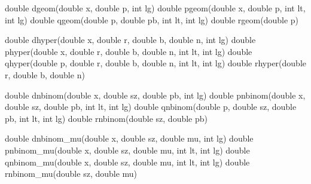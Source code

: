 \documentclass[]{book}
\newenvironment{Shaded}{\begin{snugshade}}{\end{snugshade}}
\newcommand{\DataTypeTok}[1]{\textcolor[rgb]{0.13,0.29,0.53}{#1}}
\newcommand{\NormalTok}[1]{#1}
\begin{document}
\begin{Shaded}
\begin{Highlighting}[]
\DataTypeTok{double}\NormalTok{ dgeom(}\DataTypeTok{double}\NormalTok{ x, }\DataTypeTok{double}\NormalTok{ p, }\DataTypeTok{int}\NormalTok{ lg)        }
\DataTypeTok{double}\NormalTok{ pgeom(}\DataTypeTok{double}\NormalTok{ x, }\DataTypeTok{double}\NormalTok{ p, }\DataTypeTok{int}\NormalTok{ lt, }\DataTypeTok{int}\NormalTok{ lg)    }
\DataTypeTok{double}\NormalTok{ qgeom(}\DataTypeTok{double}\NormalTok{ p, }\DataTypeTok{double}\NormalTok{ pb, }\DataTypeTok{int}\NormalTok{ lt, }\DataTypeTok{int}\NormalTok{ lg)   }
\DataTypeTok{double}\NormalTok{ rgeom(}\DataTypeTok{double}\NormalTok{ p)              }

\DataTypeTok{double}\NormalTok{ dhyper(}\DataTypeTok{double}\NormalTok{ x, }\DataTypeTok{double}\NormalTok{ r, }\DataTypeTok{double}\NormalTok{ b, }\DataTypeTok{double}\NormalTok{ n, }\DataTypeTok{int}\NormalTok{ lg)       }
\DataTypeTok{double}\NormalTok{ phyper(}\DataTypeTok{double}\NormalTok{ x, }\DataTypeTok{double}\NormalTok{ r, }\DataTypeTok{double}\NormalTok{ b, }\DataTypeTok{double}\NormalTok{ n, }\DataTypeTok{int}\NormalTok{ lt, }\DataTypeTok{int}\NormalTok{ lg)   }
\DataTypeTok{double}\NormalTok{ qhyper(}\DataTypeTok{double}\NormalTok{ p, }\DataTypeTok{double}\NormalTok{ r, }\DataTypeTok{double}\NormalTok{ b, }\DataTypeTok{double}\NormalTok{ n, }\DataTypeTok{int}\NormalTok{ lt, }\DataTypeTok{int}\NormalTok{ lg)   }
\DataTypeTok{double}\NormalTok{ rhyper(}\DataTypeTok{double}\NormalTok{ r, }\DataTypeTok{double}\NormalTok{ b, }\DataTypeTok{double}\NormalTok{ n)                 }

\DataTypeTok{double}\NormalTok{ dnbinom(}\DataTypeTok{double}\NormalTok{ x, }\DataTypeTok{double}\NormalTok{ sz, }\DataTypeTok{double}\NormalTok{ pb, }\DataTypeTok{int}\NormalTok{ lg)      }
\DataTypeTok{double}\NormalTok{ pnbinom(}\DataTypeTok{double}\NormalTok{ x, }\DataTypeTok{double}\NormalTok{ sz, }\DataTypeTok{double}\NormalTok{ pb, }\DataTypeTok{int}\NormalTok{ lt, }\DataTypeTok{int}\NormalTok{ lg)  }
\DataTypeTok{double}\NormalTok{ qnbinom(}\DataTypeTok{double}\NormalTok{ p, }\DataTypeTok{double}\NormalTok{ sz, }\DataTypeTok{double}\NormalTok{ pb, }\DataTypeTok{int}\NormalTok{ lt, }\DataTypeTok{int}\NormalTok{ lg)  }
\DataTypeTok{double}\NormalTok{ rnbinom(}\DataTypeTok{double}\NormalTok{ sz, }\DataTypeTok{double}\NormalTok{ pb)                    }

\DataTypeTok{double}\NormalTok{ dnbinom_mu(}\DataTypeTok{double}\NormalTok{ x, }\DataTypeTok{double}\NormalTok{ sz, }\DataTypeTok{double}\NormalTok{ mu, }\DataTypeTok{int}\NormalTok{ lg)       }
\DataTypeTok{double}\NormalTok{ pnbinom_mu(}\DataTypeTok{double}\NormalTok{ x, }\DataTypeTok{double}\NormalTok{ sz, }\DataTypeTok{double}\NormalTok{ mu, }\DataTypeTok{int}\NormalTok{ lt, }\DataTypeTok{int}\NormalTok{ lg)   }
\DataTypeTok{double}\NormalTok{ qnbinom_mu(}\DataTypeTok{double}\NormalTok{ x, }\DataTypeTok{double}\NormalTok{ sz, }\DataTypeTok{double}\NormalTok{ mu, }\DataTypeTok{int}\NormalTok{ lt, }\DataTypeTok{int}\NormalTok{ lg)   }
\DataTypeTok{double}\NormalTok{ rnbinom_mu(}\DataTypeTok{double}\NormalTok{ sz, }\DataTypeTok{double}\NormalTok{ mu)             }


\end{Highlighting}
\end{Shaded}
\end{document}
